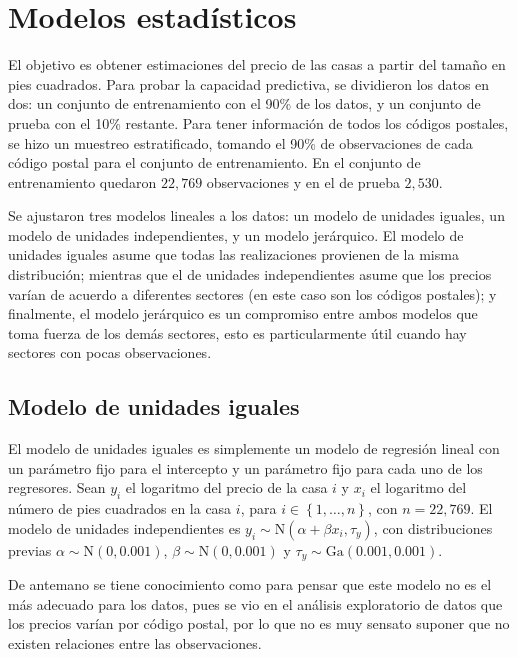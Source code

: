 
\section{Modelos estadísticos}
\label{sec:modelos}

El objetivo es obtener estimaciones del precio de las casas a partir del tamaño en pies cuadrados. Para probar la capacidad predictiva, se dividieron los datos en dos: un conjunto de entrenamiento con el 90\% de los datos, y un conjunto de prueba con el 10\% restante. Para tener información de todos los códigos postales, se hizo un muestreo estratificado, tomando el 90\% de observaciones de cada código postal para el conjunto de entrenamiento. En el conjunto de entrenamiento quedaron $22,769$ observaciones y en el de prueba $2,530$.	

Se ajustaron tres modelos lineales a los datos: un modelo de unidades iguales, un modelo de unidades independientes, y un modelo jerárquico. El modelo de unidades iguales asume que todas las realizaciones provienen de la misma distribución; mientras que el de unidades independientes asume que los precios varían de acuerdo a diferentes sectores (en este caso son los códigos postales); y finalmente, el modelo jerárquico es un compromiso entre ambos modelos que toma fuerza de los demás sectores, esto es particularmente útil cuando hay sectores con pocas observaciones.

\subsection{Modelo de unidades iguales}

El modelo de unidades iguales es simplemente un modelo de regresión lineal con un parámetro fijo para el intercepto y un parámetro fijo para cada uno de los regresores. Sean $y_i$ el logaritmo del precio de la casa $i$ y $x_i$ el logaritmo del número de pies cuadrados en la casa $i$, para $i \in \left\{1, \hdots, n \right\}$, con $n = 22,769$. El modelo de unidades independientes es $y_i \sim \mathrm{N}(\alpha + \beta x_i, \tau_y)$, con distribuciones previas $\alpha \sim \mathrm{N}(0, 0.001)$, $\beta \sim \mathrm{N}(0, 0.001)$ y $\tau_y \sim \mathrm{Ga}(0.001, 0.001)$. %

De antemano se tiene conocimiento como para pensar que este modelo no es el más adecuado para los datos, pues se vio en el análisis exploratorio de datos que los precios varían por código postal, por lo que no es muy sensato suponer que no existen relaciones entre las observaciones.

